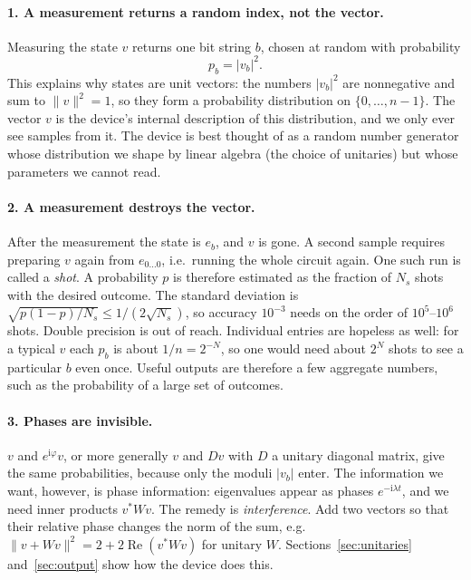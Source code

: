 \documentclass[11pt,a4paper]{article}
\begin{document}
\paragraph{1. A measurement returns a random index, not the vector.}
Measuring the state $v$ returns one bit string $b$, chosen at random with
probability
\[
  p_b=|v_b|^2 .
\]
This explains why states are unit vectors: the numbers $|v_b|^2$ are
nonnegative and sum to $\|v\|^2=1$, so they form a probability
distribution on $\{0,\dots,n-1\}$. The vector $v$ is the device's
internal description of this distribution, and we only ever see samples
from it. The device is best thought of as a random number generator
whose distribution we shape by linear algebra (the choice of unitaries)
but whose parameters we cannot read.

\paragraph{2. A measurement destroys the vector.} After the measurement
the state is $e_b$, and $v$ is gone. A second sample requires preparing
$v$ again from $e_{0\dots0}$, i.e.\ running the whole circuit again. One
such run is called a \emph{shot}. A probability $p$ is therefore
estimated as the fraction of $N_s$ shots with the desired outcome. The
standard deviation is $\sqrt{p(1-p)/N_s}\le 1/(2\sqrt{N_s})$, so
accuracy $10^{-3}$ needs on the order of $10^5$--$10^6$ shots. Double
precision is out of reach. Individual entries are hopeless as well: for a
typical $v$ each $p_b$ is about $1/n=2^{-N}$, so one would need about
$2^N$ shots to see a particular $b$ even once. Useful outputs are
therefore a few aggregate numbers, such as the probability of a large
set of outcomes.

\paragraph{3. Phases are invisible.} $v$ and $e^{\mathrm{i}\varphi}v$, or more
generally $v$ and $Dv$ with $D$ a unitary diagonal matrix, give the same
probabilities, because only the moduli $|v_b|$ enter. The information we
want, however, is phase information: eigenvalues appear as phases
$e^{-\mathrm{i}\lambda t}$, and we need inner products $v^*Wv$. The remedy is
\emph{interference}. Add two vectors so that their relative phase changes
the norm of the sum, e.g.\ $\|v+Wv\|^2=2+2\operatorname{Re}(v^*Wv)$ for unitary $W$.
Sections~\ref{sec:unitaries} and~\ref{sec:output} show how the device
does this.
\end{document}
